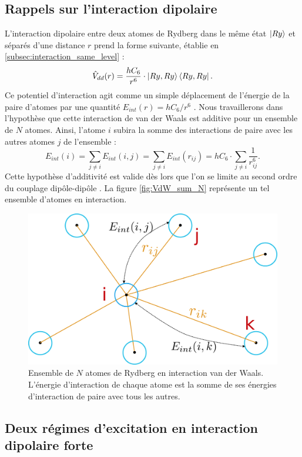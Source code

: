 	\subsection{Rappels sur l'interaction dipolaire}
\noindent L'interaction dipolaire entre deux atomes de Rydberg dans le même état $\ket{Ry}$ et séparés d'une distance $r$ prend la forme suivante, établie en \ref{subsec:interaction_same_level} :
\begin{equation}
\label{eq:Vdd_aa}
\hat{V}_{dd}(r) = \frac{hC_6}{r^6} \cdot \ket{Ry,Ry}\bra{Ry,Ry}.
\end{equation}
Ce potentiel d'interaction agit comme un simple déplacement de l'énergie de la paire d'atomes par une quantité $E_{int} (r)=hC_6/r^6$ .
Nous travaillerons dans l'hypothèse que cette interaction de van der Waals est additive pour un ensemble de $N$ atomes.
Ainsi, l'atome $i$ subira la somme des interactions de paire avec les autres atomes $j$ de l'ensemble :
\begin{equation}
\label{eq:Eint_isum}
E_{int}(i) = \sum_{j\neq i} E_{int}(i,j) = \sum_{j\neq i} E_{int}(r_{ij}) = h C_6 \cdot \sum_{j \neq i} \frac{1}{r_{ij}^6}.
\end{equation}
Cette hypothèse d'additivité est valide dès lors que l'on se limite au second ordre du couplage dipôle-dipôle \cite{ENS_CHIPINTERACTION15,MX_TELLER_ADDITIVEVDW}.
La figure \eqref{fig:VdW_sum_N} représente un tel ensemble d'atomes en interaction.
%
\begin{figure}[h]
\centering
\includegraphics[width=0.6\linewidth]{figures/low_l/Natomes}
\caption[Ensemble de $N$ atomes de Rydberg en interaction van der Waals]
{Ensemble de $N$ atomes de Rydberg en interaction van der Waals.
L'énergie d'interaction de chaque atome est la somme de ses énergies d'interaction de paire avec tous les autres.
}
\label{fig:VdW_sum_N}
\end{figure}

	\subsection{Deux régimes d'excitation en interaction dipolaire forte}\label{subsec:excitation_bloc_facil}

